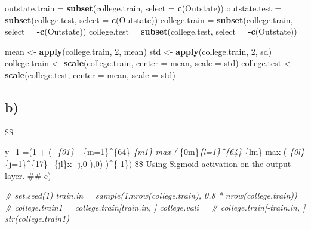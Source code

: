 \documentclass[
]{article}
\newenvironment{Shaded}{\begin{snugshade}}{\end{snugshade}}
\newcommand{\CommentTok}[1]{\textcolor[rgb]{0.56,0.35,0.01}{\textit{#1}}}
\newcommand{\DataTypeTok}[1]{\textcolor[rgb]{0.13,0.29,0.53}{#1}}
\newcommand{\DecValTok}[1]{\textcolor[rgb]{0.00,0.00,0.81}{#1}}
\newcommand{\KeywordTok}[1]{\textcolor[rgb]{0.13,0.29,0.53}{\textbf{#1}}}
\newcommand{\NormalTok}[1]{#1}
\newcommand{\OperatorTok}[1]{\textcolor[rgb]{0.81,0.36,0.00}{\textbf{#1}}}
\newcommand{\StringTok}[1]{\textcolor[rgb]{0.31,0.60,0.02}{#1}}
\begin{document}
\begin{Shaded}
\begin{Highlighting}[]
\NormalTok{outstate.train =}\StringTok{ }\KeywordTok{subset}\NormalTok{(college.train, }\DataTypeTok{select =} \KeywordTok{c}\NormalTok{(Outstate))}
\NormalTok{outstate.test =}\StringTok{ }\KeywordTok{subset}\NormalTok{(college.test, }\DataTypeTok{select =} \KeywordTok{c}\NormalTok{(Outstate))}
\NormalTok{college.train =}\StringTok{ }\KeywordTok{subset}\NormalTok{(college.train, }\DataTypeTok{select =} \OperatorTok{-}\KeywordTok{c}\NormalTok{(Outstate))}
\NormalTok{college.test =}\StringTok{ }\KeywordTok{subset}\NormalTok{(college.test, }\DataTypeTok{select =} \OperatorTok{-}\KeywordTok{c}\NormalTok{(Outstate))}

\NormalTok{mean <-}\StringTok{ }\KeywordTok{apply}\NormalTok{(college.train, }\DecValTok{2}\NormalTok{, mean)}
\NormalTok{std <-}\StringTok{ }\KeywordTok{apply}\NormalTok{(college.train, }\DecValTok{2}\NormalTok{, sd)}
\NormalTok{college.train <-}\StringTok{ }\KeywordTok{scale}\NormalTok{(college.train, }\DataTypeTok{center =}\NormalTok{ mean, }\DataTypeTok{scale =}\NormalTok{ std)}
\NormalTok{college.test <-}\StringTok{ }\KeywordTok{scale}\NormalTok{(college.test, }\DataTypeTok{center =}\NormalTok{ mean, }\DataTypeTok{scale =}\NormalTok{ std)}
\end{Highlighting}
\end{Shaded}

\hypertarget{b}{%
\subsection{b)}\label{b}}

\$\$

y\_1 =\Big(1 + \exp \Big( -\beta\emph{\{01\} - \sum}\{m=1\}\^{}\{64\}
\beta\emph{\{m1\} max \Big( \gamma}\{0m\}\sum\emph{\{l=1\}\^{}\{64\}
\gamma}\{lm\} max \Big(
\alpha\emph{\{0l\}\sum}\{j=1\}\^{}\{17\}\alpha\_\{jl\}x\_j,0
\Big),0\Big) \Big)\^{}\{-1\}\Big) \$\$ Using Sigmoid activation on the
output layer. \#\# c)

\begin{Shaded}
\begin{Highlighting}[]
\CommentTok{# set.seed(1) train.in = sample(1:nrow(college.train), 0.8 * nrow(college.train))}
\CommentTok{# college.train1 = college.train[train.in, ] college.vali =}
\CommentTok{# college.train[-train.in, ] str(college.train1)}
\end{Highlighting}
\end{Shaded}
\end{document}
